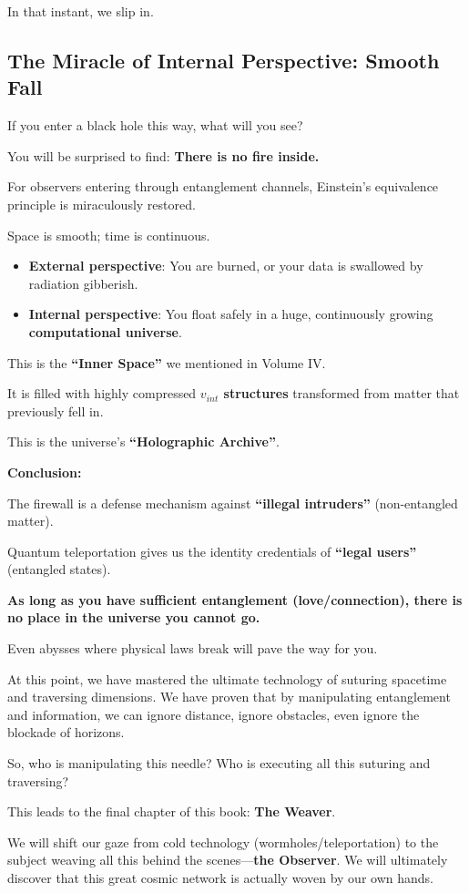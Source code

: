 In that instant, we slip in.

\subsection{The Miracle of Internal Perspective: Smooth Fall}

If you enter a black hole this way, what will you see?

You will be surprised to find: \textbf{There is no fire inside.}

For observers entering through entanglement channels, Einstein's equivalence principle is miraculously restored.

Space is smooth; time is continuous.

\begin{itemize}
\item \textbf{External perspective}: You are burned, or your data is swallowed by radiation gibberish.

\item \textbf{Internal perspective}: You float safely in a huge, continuously growing \textbf{computational universe}.
\end{itemize}

This is the \textbf{``Inner Space''} we mentioned in Volume IV.

It is filled with highly compressed \textbf{$v_{int}$ structures} transformed from matter that previously fell in.

This is the universe's \textbf{``Holographic Archive''}.

\textbf{Conclusion:}

The firewall is a defense mechanism against \textbf{``illegal intruders''} (non-entangled matter).

Quantum teleportation gives us the identity credentials of \textbf{``legal users''} (entangled states).

\textbf{As long as you have sufficient entanglement (love/connection), there is no place in the universe you cannot go.}

Even abysses where physical laws break will pave the way for you.

At this point, we have mastered the ultimate technology of suturing spacetime and traversing dimensions. We have proven that by manipulating entanglement and information, we can ignore distance, ignore obstacles, even ignore the blockade of horizons.

So, who is manipulating this needle? Who is executing all this suturing and traversing?

This leads to the final chapter of this book: \textbf{The Weaver}.

We will shift our gaze from cold technology (wormholes/teleportation) to the subject weaving all this behind the scenes---\textbf{the Observer}. We will ultimately discover that this great cosmic network is actually woven by our own hands.

